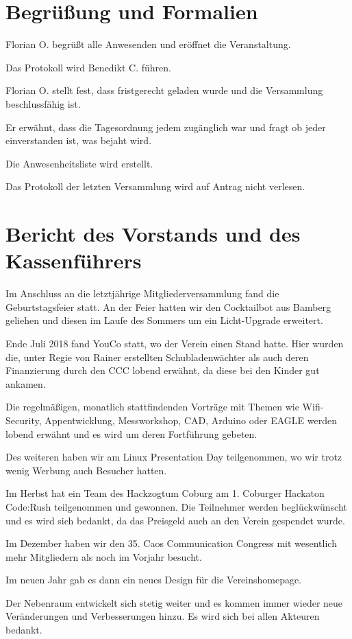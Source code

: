 \section{Begrüßung und Formalien}
Florian O. begrüßt alle Anwesenden und eröffnet die Veranstaltung. 

Das Protokoll wird Benedikt C. führen.

Florian O. stellt fest, dass fristgerecht geladen wurde und die Versammlung beschlussfähig ist. 

Er erwähnt, dass die Tagesordnung jedem zugänglich war und fragt ob jeder einverstanden ist, was bejaht wird.

Die Anwesenheitsliste wird erstellt.

Das Protokoll der letzten Versammlung wird auf Antrag nicht verlesen. 


\section{Bericht des Vorstands und des Kassenführers}
Im Anschluss an die letztjährige Mitgliederversammlung fand die Geburtstagsfeier statt.
An der Feier hatten wir den Cocktailbot aus Bamberg geliehen und diesen im Laufe des Sommers um ein Licht-Upgrade erweitert.

Ende Juli 2018 fand YouCo statt, wo der Verein einen Stand hatte. Hier wurden die, unter Regie von Rainer erstellten Schubladenwächter als auch deren Finanzierung durch den CCC lobend erwähnt, da diese bei den Kinder gut ankamen.

Die regelmäßigen, monatlich stattfindenden Vorträge mit Themen wie Wifi-Security, Appentwicklung, Messworkshop, CAD, Arduino oder EAGLE werden lobend erwähnt und es wird um deren Fortführung gebeten.

Des weiteren haben wir am Linux Presentation Day teilgenommen, wo wir trotz wenig Werbung auch Besucher hatten.

Im Herbst hat ein Team des Hackzogtum Coburg am 1. Coburger Hackaton Code:Rush teilgenommen und gewonnen. Die Teilnehmer werden beglückwünscht und es wird sich bedankt, da das Preisgeld auch an den Verein gespendet wurde.

Im Dezember haben wir den 35. Caos Communication Congress mit wesentlich mehr Mitgliedern als noch im Vorjahr besucht.

Im neuen Jahr gab es dann ein neues Design für die Vereinshomepage.

Der Nebenraum entwickelt sich stetig weiter und es kommen immer wieder neue Veränderungen und Verbesserungen hinzu. Es wird sich bei allen Akteuren bedankt.

